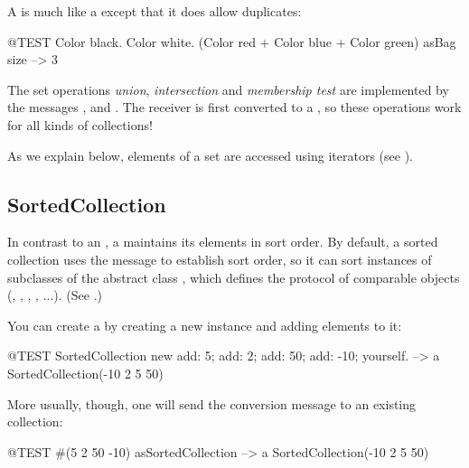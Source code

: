 \documentclass[a4paper,10pt,twoside]{book}
\begin{document}
A  is much like a  except that it does allow duplicates:
\begin{code}{@TEST}
{ Color black. Color white. (Color red + Color blue + Color green) } asBag size --> 3
\end{code}

The set operations \emph{union}, \emph{intersection} and \emph{membership test} are implemented by the  messages ,  and .
The receiver is first converted to a , so these operations work for all kinds of collections!


As we explain below, elements of a set are accessed using iterators (see ).

\subsection{SortedCollection}
In contrast to an , a  maintains its elements in sort order. By default, a sorted collection uses the message  to establish sort order, so it can sort instances of subclasses of the abstract class , which defines the protocol of comparable objects (, , , , ...).
(See .)

You can create a  by creating a new instance and adding elements to it:
\begin{code}{@TEST}
SortedCollection new add: 5; add: 2; add: 50; add: -10; yourself. --> a SortedCollection(-10 2 5 50)
\end{code}

\noindent
More usually, though, one will send the conversion message  to an existing collection:
\begin{code}{@TEST}
#(5 2 50 -10) asSortedCollection --> a SortedCollection(-10 2 5 50)
\end{code}
\end{document}
